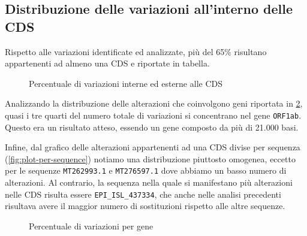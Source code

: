 \documentclass[11pt,italian]{article}
\begin{document}
\subsection{Distribuzione delle variazioni all'interno delle CDS}
Rispetto alle variazioni identificate ed analizzate, più del 65\% risultano appartenenti ad almeno una CDS e riportate in tabella.
\begin{figure}[H]
  \caption{Percentuale di variazioni interne ed esterne alle CDS}
  \label{fig:plot-alterations-in-cds}
\end{figure}

Analizzando la distribuzione delle alterazioni che coinvolgono geni riportata in \cref{fig:plot-alterations-per-gene}, quasi i tre quarti del numero totale di variazioni si concentrano nel gene \lstinline{ORF1ab}. Questo era un risultato atteso, essendo un gene composto da più di 21.000 basi.

\vspace{1mm}
Infine, dal grafico delle alterazioni appartenenti ad una CDS divise per sequenza (\cref{fig:plot-per-sequence}) notiamo una distribuzione piuttosto omogenea, eccetto per le sequenze \lstinline{MT262993.1} e \lstinline{MT276597.1} dove abbiamo un basso numero di alterazioni.
Al contrario, la sequenza nella quale si manifestano più alterazioni nelle CDS risulta essere \lstinline{EPI_ISL_437334}, che anche nelle analisi precedenti risultava avere il maggior numero di sostituzioni rispetto alle altre sequenze.
\begin{figure}[]
  \caption{Percentuale di variazioni per gene}
  \label{fig:plot-alterations-per-gene}
\end{figure}
\end{document}
